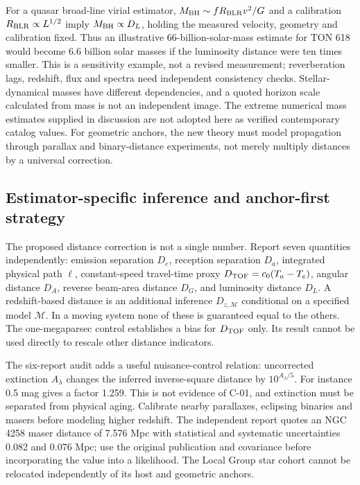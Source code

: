 \documentclass[
  11pt,
  twoside]{article}
\begin{document}
For a quasar broad-line virial estimator,
\(M_{\rm BH}\sim fR_{\rm BLR}v^2/G\) and a calibration
\(R_{\rm BLR}\propto L^{1/2}\) imply \(M_{\rm BH}\propto D_L\), holding
the measured velocity, geometry and calibration fixed. Thus an
illustrative 66-billion-solar-mass estimate for TON 618 would become 6.6
billion solar masses if the luminosity distance were ten times smaller.
This is a sensitivity example, not a revised measurement; reverberation
lags, redshift, flux and spectra need independent consistency checks.
Stellar-dynamical masses have different dependencies, and a quoted
horizon scale calculated from mass is not an independent image. The
extreme numerical mass estimates supplied in discussion are not adopted
here as verified contemporary catalog values. For geometric anchors, the
new theory must model propagation through parallax and binary-distance
experiments, not merely multiply distances by a universal correction.

\subsection{Estimator-specific inference and anchor-first
strategy}\label{estimator-specific-inference-and-anchor-first-strategy}

The proposed distance correction is not a single number. Report seven
quantities independently: emission separation \(D_e\), reception
separation \(D_a\), integrated physical path \(\ell\), constant-speed
travel-time proxy \(D_{\rm TOF}=c_0(T_a-T_e)\), angular distance
\(D_A\), reverse beam-area distance \(D_G\), and luminosity distance
\(D_L\). A redshift-based distance is an additional inference
\(D_{z,\mathcal M}\) conditional on a specified model \(\mathcal M\). In
a moving system none of these is guaranteed equal to the others. The
one-megaparsec control establishes a bias for \(D_{\rm TOF}\) only. Its
result cannot be used directly to rescale other distance indicators.

The six-report audit adds a useful nuisance-control relation:
uncorrected extinction \(A_\lambda\) changes the inferred inverse-square
distance by \(10^{A_\lambda/5}\). For instance 0.5 mag gives a factor
1.259. This is not evidence of C-01, and extinction must be separated
from physical aging. Calibrate nearby parallaxes, eclipsing binaries and
masers before modeling higher redshift. The independent report quotes an
NGC 4258 maser distance of 7.576 Mpc with statistical and systematic
uncertainties 0.082 and 0.076 Mpc; use the original publication and
covariance before incorporating the value into a likelihood. The Local
Group star cohort cannot be relocated independently of its host and
geometric anchors.
\end{document}

